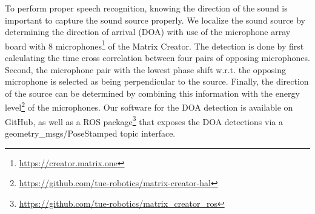 To perform proper speech recognition, knowing the direction of the sound is important to capture the sound source properly. We localize the sound source by determining the direction of arrival (DOA) with use of the microphone array board with 8 microphones\footnote{\url{https://creator.matrix.one}} of the Matrix Creator.
The detection is done by first calculating the time cross correlation between four pairs of opposing microphones. Second, the microphone pair with the lowest phase shift w.r.t. the opposing microphone is selected as being perpendicular to the source. Finally, the direction of the source can be determined by combining this information with the energy level\footnote{\url{https://github.com/tue-robotics/matrix-creator-hal}} of the microphones. Our software for the DOA detection is available on GitHub, as well as a ROS package\footnote{\url{https://github.com/tue-robotics/matrix_creator_ros}} that exposes the DOA detections via a geometry\_msgs/PoseStamped topic interface. 